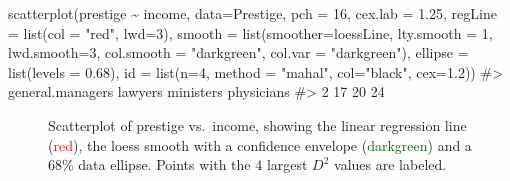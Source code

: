 \documentclass[
  letterpaper,
  10pt,
  krantz2]{krantz}
\makeatletter
\newenvironment{Shaded}{\begin{snugshade}}{\end{snugshade}}
\newcommand{\AttributeTok}[1]{\textcolor[rgb]{0.40,0.45,0.13}{#1}}
\newcommand{\CommentTok}[1]{\textcolor[rgb]{0.37,0.37,0.37}{#1}}
\newcommand{\DecValTok}[1]{\textcolor[rgb]{0.68,0.00,0.00}{#1}}
\newcommand{\FloatTok}[1]{\textcolor[rgb]{0.68,0.00,0.00}{#1}}
\newcommand{\FunctionTok}[1]{\textcolor[rgb]{0.28,0.35,0.67}{#1}}
\newcommand{\NormalTok}[1]{\textcolor[rgb]{0.00,0.23,0.31}{#1}}
\newcommand{\SpecialCharTok}[1]{\textcolor[rgb]{0.37,0.37,0.37}{#1}}
\newcommand{\StringTok}[1]{\textcolor[rgb]{0.13,0.47,0.30}{#1}}
\newenvironment{kframe}{%
  \medskip{}
  \setlength{\fboxsep}{.8em}
  \def\at@end@of@kframe{}%
  \ifinner\ifhmode%
  \def\at@end@of@kframe{\end{minipage}}%
  \begin{minipage}{\columnwidth}%
  \fi\fi%
  \def\FrameCommand##1{\hskip\@totalleftmargin \hskip-\fboxsep
  \colorbox{shadecolor}{##1}\hskip-\fboxsep
      \hskip-\linewidth \hskip-\@totalleftmargin \hskip\columnwidth}%
  \MakeFramed {\advance\hsize-\width
    \@totalleftmargin\z@ \linewidth\hsize
    \@setminipage}}%
{\par\unskip\endMakeFramed%
  \at@end@of@kframe}
\renewenvironment{Shaded}{\begin{kframe}}{\end{kframe}}
\makeatother
\begin{document}
\begin{Shaded}
\begin{Highlighting}[]
\FunctionTok{scatterplot}\NormalTok{(prestige }\SpecialCharTok{\textasciitilde{}}\NormalTok{ income, }\AttributeTok{data=}\NormalTok{Prestige,}
  \AttributeTok{pch =} \DecValTok{16}\NormalTok{, }\AttributeTok{cex.lab =} \FloatTok{1.25}\NormalTok{,}
  \AttributeTok{regLine =} \FunctionTok{list}\NormalTok{(}\AttributeTok{col =} \StringTok{"red"}\NormalTok{, }\AttributeTok{lwd=}\DecValTok{3}\NormalTok{),}
  \AttributeTok{smooth =} \FunctionTok{list}\NormalTok{(}\AttributeTok{smoother=}\NormalTok{loessLine, }
                \AttributeTok{lty.smooth =} \DecValTok{1}\NormalTok{, }\AttributeTok{lwd.smooth=}\DecValTok{3}\NormalTok{,}
                \AttributeTok{col.smooth =} \StringTok{"darkgreen"}\NormalTok{, }
                \AttributeTok{col.var =} \StringTok{"darkgreen"}\NormalTok{),}
  \AttributeTok{ellipse =} \FunctionTok{list}\NormalTok{(}\AttributeTok{levels =} \FloatTok{0.68}\NormalTok{),}
  \AttributeTok{id =} \FunctionTok{list}\NormalTok{(}\AttributeTok{n=}\DecValTok{4}\NormalTok{, }\AttributeTok{method =} \StringTok{"mahal"}\NormalTok{, }\AttributeTok{col=}\StringTok{"black"}\NormalTok{, }\AttributeTok{cex=}\FloatTok{1.2}\NormalTok{))}
\CommentTok{\#\textgreater{} general.managers          lawyers        ministers       physicians }
\CommentTok{\#\textgreater{}                2               17               20               24}
\end{Highlighting}
\end{Shaded}

\begin{figure}[H]


\caption{\label{fig-Prestige-scatterplot-income1}Scatterplot of prestige
vs.~income, showing the linear regression line (\textcolor{red}{red}),
the loess smooth with a confidence envelope
(\textcolor{darkgreen}{darkgreen}) and a 68\% data ellipse. Points with
the 4 largest \(D^2\) values are labeled.}

\end{figure}%
\end{document}
